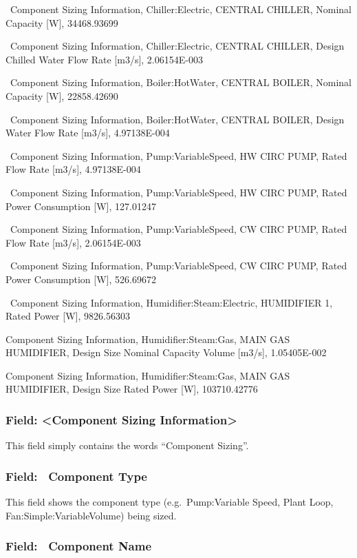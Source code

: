 ~Component Sizing Information, Chiller:Electric, CENTRAL CHILLER, Nominal Capacity {[}W{]}, 34468.93699

~Component Sizing Information, Chiller:Electric, CENTRAL CHILLER, Design Chilled Water Flow Rate {[}m3/s{]}, 2.06154E-003

~Component Sizing Information, Boiler:HotWater, CENTRAL BOILER, Nominal Capacity {[}W{]}, 22858.42690

~Component Sizing Information, Boiler:HotWater, CENTRAL BOILER, Design Water Flow Rate {[}m3/s{]}, 4.97138E-004

~Component Sizing Information, Pump:VariableSpeed, HW CIRC PUMP, Rated Flow Rate {[}m3/s{]}, 4.97138E-004

~Component Sizing Information, Pump:VariableSpeed, HW CIRC PUMP, Rated Power Consumption {[}W{]}, 127.01247

~Component Sizing Information, Pump:VariableSpeed, CW CIRC PUMP, Rated Flow Rate {[}m3/s{]}, 2.06154E-003

~Component Sizing Information, Pump:VariableSpeed, CW CIRC PUMP, Rated Power Consumption {[}W{]}, 526.69672

~Component Sizing Information, Humidifier:Steam:Electric, HUMIDIFIER 1, Rated Power {[}W{]}, 9826.56303

Component Sizing Information, Humidifier:Steam:Gas, MAIN GAS HUMIDIFIER, Design Size Nominal Capacity Volume {[}m3/s{]}, 1.05405E-002

Component Sizing Information, Humidifier:Steam:Gas, MAIN GAS HUMIDIFIER, Design Size Rated Power {[}W{]}, 103710.42776

\subsubsection{Field: \textless{}Component Sizing Information\textgreater{}}\label{field-component-sizing-information}

This field simply contains the words ``Component Sizing''.

\subsubsection{Field: ~Component Type}\label{field-component-type}

This field shows the component type (e.g.~Pump:Variable Speed, Plant Loop, Fan:Simple:VariableVolume) being sized.

\subsubsection{Field: ~Component Name}\label{field-component-name}

